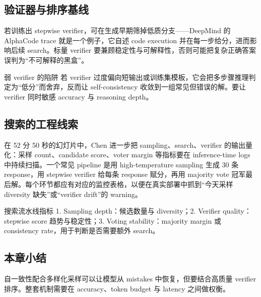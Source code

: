 \subsection{验证器与排序基线}
若训练出 stepwise verifier，可在生成早期筛掉低质分支——DeepMind 的 AlphaCode trace 就是一个例子，它自述 code execution 并在每一步给分，进而影响后续 search。标量 verifier 要兼顾稳定性与可解释性，否则可能把复杂正确答案误判为“不可解释的黑盒”。

\begin{warningbox}{弱 verifier 的陷阱}
若 verifier 过度偏向短输出或训练集模板，它会把多步骤推理判定为“低分”而舍弃，反而让 self-consistency 收敛到一组常见但错误的解。要让 verifier 同时敏感 accuracy 与 reasoning depth。
\end{warningbox}

\subsection{搜索的工程线索}
在 52 分 50 秒的幻灯片中，Chen 进一步把 sampling、search、verifier 的输出量化：采样 count、candidate score、voter margin 等指标要在 inference-time logs 中持续扫描。一个常见 pipeline 是用 high-temperature sampling 生成 30 条 response，用 stepwise verifier 给每条 response 赋分，再用 majority vote 冠军最后解。每个环节都应有对应的监控表格，以便在真实部署中抓到“今天采样 diversity 缺失”或“verifier drift”的 warning。

\begin{knowledgebox}{搜索流水线指标}
1. Sampling depth：候选数量与 diversity；2. Verifier quality：stepwise score 趋势与稳定性；3. Voting stability：majority margin 或 consistency rate，用于判断是否需要额外 search。
\end{knowledgebox}

\subsection{本章小结}
自一致性配合多样化采样可以让模型从 mistakes 中恢复，但要结合高质量 verifier 排序。整套机制需要在 accuracy、token budget 与 latency 之间做权衡。

